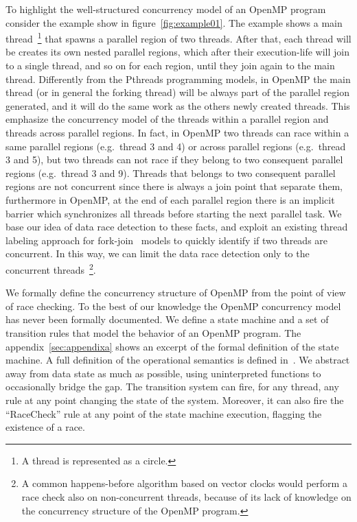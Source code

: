 To highlight the well-structured concurrency model of an OpenMP program
consider the example show in figure~\ref{fig:example01}.
%
The example shows a main thread~\footnote{A thread is represented as a
  circle.} that spawns a parallel region of two threads.
%
After that, each thread will be creates its own nested parallel regions, which
after their execution-life will join to a single thread, and so on for each
region, until they join again to the main thread.
%
Differently from the Pthreads programming models, in OpenMP the main thread
(or in general the forking thread) will be always part of the parallel region
generated, and it will do the same work as the others newly created threads.
%
This emphasize the concurrency model of the threads within a parallel region
and threads across parallel regions.
%
In fact, in OpenMP two threads can race within a same parallel regions (e.g.\
thread 3 and 4) or across parallel regions (e.g.\ thread 3 and 5), but two
threads can not race if they belong to two consequent parallel regions (e.g.\
thread 3 and 9).
%
Threads that belongs to two consequent parallel regions are not concurrent
since there is always a join point that separate them, furthermore in OpenMP,
at the end of each parallel region there is an implicit barrier which
synchronizes all threads before starting the next parallel task.
%
We base our idea of data race detection to these facts, and exploit an
existing thread labeling approach for
fork-join~\cite{Mellor-Crummey:1991:ODD:125826.125861} models to quickly
identify if two threads are concurrent.
%
In this way, we can limit the data race detection only to the concurrent
threads~\footnote{A common happens-before algorithm based on vector clocks
  would perform a race check also on non-concurrent threads, because of its
  lack of knowledge on the concurrency structure of the OpenMP program.}.

We formally define the concurrency structure of OpenMP from the point of view
of race checking.
%
To the best of our knowledge the OpenMP concurrency model has never been
formally documented.
%
We define a state machine and a set of transition rules that model the
behavior of an OpenMP program.                            
%
The appendix~\ref{sec:appendixa} shows an excerpt of the formal definition of
the state machine.
%
A full definition of the operational semantics is defined
in~\cite{atzeni_opsem16}.
%
We abstract away from data state as much as possible, using uninterpreted
functions to occasionally bridge the gap.
%
The transition system can fire, for any thread, any rule at any point changing
the state of the system.
%
Moreover, it can also fire the ``RaceCheck'' rule at any point of the state
machine execution, flagging the existence of a race.

